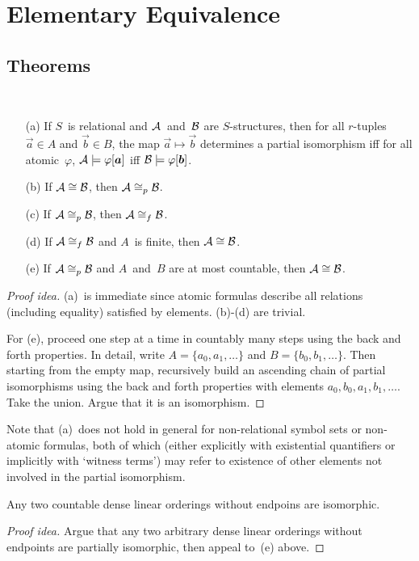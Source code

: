 %
%
\section{Elementary Equivalence}
\subsection*{Theorems}
\begin{lem}
\ 
\begin{enumerate}[itemsep=0pt]
\item[(a)] If \(S\)~is relational and \(\mathcal{A}\)~and~\(\mathcal{B}\) are \(S\)-structures, then for all \(r\)-tuples \(\vec{a}\in A\) and \(\vec{b}\in B\), the map \(\vec{a}\mapsto\vec{b}\) determines a partial isomorphism iff for all atomic~\(\varphi\), \(\mathcal{A}\models\varphi[\boldsymbol{a}]\) iff \(\mathcal{B}\models\varphi[\boldsymbol{b}]\).
\item[(b)] If \(\mathcal{A}\cong\mathcal{B}\), then \(\mathcal{A}\cong_p\mathcal{B}\).
\item[(c)] If \(\mathcal{A}\cong_p\mathcal{B}\), then \(\mathcal{A}\cong_f\mathcal{B}\).
\item[(d)] If \(\mathcal{A}\cong_f\mathcal{B}\) and \(A\)~is finite, then \(\mathcal{A}\cong\mathcal{B}\).
\item[(e)] If \(\mathcal{A}\cong_p\mathcal{B}\) and \(A\)~and~\(B\) are at most countable, then \(\mathcal{A}\cong\mathcal{B}\).
\end{enumerate}
\end{lem}
\begin{proof}[Proof idea]
(a)~is immediate since atomic formulas describe all relations (including equality) satisfied by elements. (b)-(d) are trivial.

For (e), proceed one step at a time in countably many steps using the back and forth properties. In detail, write \(A=\{a_0,a_1,\ldots\}\) and \(B=\{b_0,b_1,\ldots\}\). Then starting from the empty map, recursively build an ascending chain of partial isomorphisms using the back and forth properties with elements \(a_0,b_0,a_1,b_1,\ldots\). Take the union. Argue that it is an isomorphism.
\end{proof}
\begin{rmk}
Note that (a)~does not hold in general for non-relational symbol sets or non-atomic formulas, both of which (either explicitly with existential quantifiers or implicitly with `witness terms') may refer to existence of other elements not involved in the partial isomorphism.
\end{rmk}

\begin{cor}[Cantor]
Any two countable dense linear orderings without endpoins are isomorphic.
\end{cor}
\begin{proof}[Proof idea]
Argue that any two arbitrary dense linear orderings without endpoints are partially isomorphic, then appeal to~(e) above.
\end{proof}

